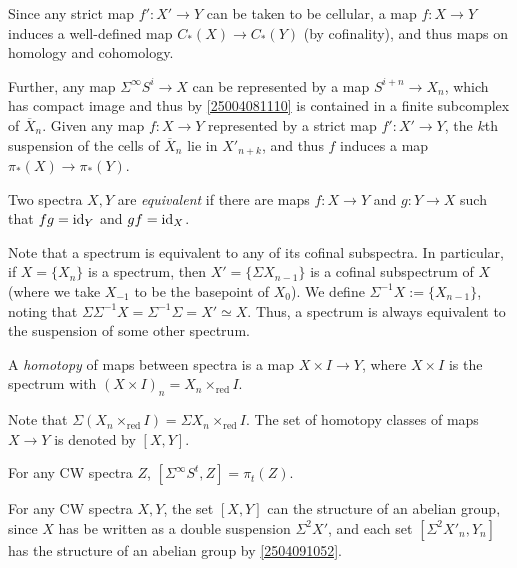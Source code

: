 \documentclass{MetricNotes2023}
\def\id{\ensuremath\text{id}}
\begin{document}
Since any strict map \(f' : X' \to Y\) can be taken to be cellular, a map \(f : X \to Y\) induces a well-defined map \(C_*(X)\to C_*(Y)\) (by cofinality), and thus maps on homology and cohomology. 

Further, any map \(\Sigma^\infty S^i \to X\) can be represented by a map \(S^{i+n}\to X_n\), which has compact image and thus by \ref{25004081110} is contained in a finite subcomplex of \(\overline X_n\). Given any map \(f : X \to Y\) represented by a strict map \(f' : X' \to Y\), the \(k\)th suspension of the cells of \(\overline X_n\) lie in \(X'_{n+k}\), and thus \(f\) induces a map \(\pi_*(X) \to \pi_*(Y)\). %

\begin{definition}
Two spectra \(X, Y\) are \textit{equivalent} if there are maps \(f : X \to Y\) and \(g : Y \to X\) such that \(fg=\id_{Y}\) and \(gf=\id_X\).
\end{definition}


Note that a spectrum is equivalent to any of its cofinal subspectra. In particular, if \(X=\{X_n\}\) is a spectrum, then \(X'=\{\Sigma X_{n-1}\}\) is a cofinal subspectrum of \(X\) (where we take \(X_{-1}\) to be the basepoint of \(X_0\)). We define \(\Sigma^{-1}X:=\{X_{n-1}\}\), noting that \(\Sigma \Sigma^{-1}X=\Sigma^{-1}\Sigma=X'\simeq X\). Thus, a spectrum is always equivalent to the suspension of some other spectrum.

\begin{definition}
A \textit{homotopy} of maps between spectra is a map \(X\times I \to Y\), where \(X\times I\) is the spectrum with \((X\times I)_n=X_n\times_{\text{red}} I\).
\end{definition}

Note that \(\Sigma(X_n\times_{\text{red}}I)=\Sigma X_n\times_{\text{red}}I\). The set of homotopy classes of maps \(X\to Y\) is denoted by \([X,Y]\). 

\begin{remark}
For any CW spectra \(Z\), \([\Sigma^\infty S^t, Z]=\pi_t(Z)\). %
\end{remark}

For any CW spectra \(X,Y\), the set \([X,Y]\) can the structure of an abelian group, since \(X\) has be written as a double suspension \(\Sigma^2X'\), and each set \([\Sigma^2X'_n, Y_n]\) has the structure of an abelian group by \ref{2504091052}. 
\end{document}
